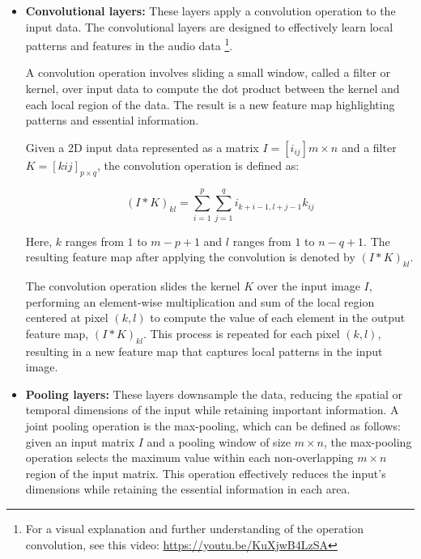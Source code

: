\begin{itemize}

\item \textbf{Convolutional layers:} These layers apply a convolution operation to the input data. The convolutional layers are designed to effectively learn local patterns and features in the audio data \footnote{For a visual explanation and further understanding of the operation convolution, see this video: \url{https://youtu.be/KuXjwB4LzSA}}.

A convolution operation involves sliding a small window, called a filter or kernel, over input data to compute the dot product between the kernel and each local region of the data. The result is a new feature map highlighting patterns and essential information.

Given a 2D input data represented as a matrix $I = [i_{ij}]{m \times n}$ and a filter $K = [k{ij}]_{p \times q}$, the convolution operation is defined as:

$$(I * K)_{kl} = \sum_{i=1}^{p} \sum_{j=1}^{q} i_{k+i-1, l+j-1}k_{ij}$$

Here, $k$ ranges from $1$ to $m-p+1$ and $l$ ranges from $1$ to $n-q+1$. The resulting feature map after applying the convolution is denoted by $(I * K)_{kl}$.

The convolution operation slides the kernel $K$ over the input image $I$, performing an element-wise multiplication and sum of the local region centered at pixel $(k,l)$ to compute the value of each element in the output feature map, $(I * K)_{kl}$. This process is repeated for each pixel $(k,l)$, resulting in a new feature map that captures local patterns in the input image.




\item \textbf{Pooling layers:} These layers downsample the data, reducing the spatial or temporal dimensions of the input while retaining important information. A joint pooling operation is the max-pooling, which can be defined as follows: given an input matrix $I$ and a pooling window of size $m \times n$, the max-pooling operation selects the maximum value within each non-overlapping $m \times n$ region of the input matrix. This operation effectively reduces the input's dimensions while retaining the essential information in each area.
\vspace*{3mm}




\end{itemize}
